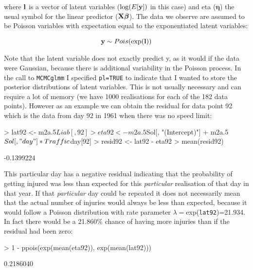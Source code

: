 \documentclass{article}
\begin{document}
where ${\bf l}$ is a vector of latent variables ($\textrm{log}(E[{\bf y}])$ in this case) and eta (${\bm \eta}$) the usual symbol for the linear predictor (${\bf X}{\bm \beta}$). The data we observe are assumed to be Poisson variables with expectation equal to the exponentiated latent variables: 

\begin{equation}
{\bf y} \sim Pois(\textrm{exp}({\bf l}))
\end{equation}


Note that the latent variable does not exactly predict y, as it would if the data were Gaussian, because there is additional variability in the Poisson process. In the call to \texttt{MCMCglmm} I specified \texttt{pl=TRUE} to indicate that I wanted to store the posterior distributions of latent variables. This is not usually necessary and can require a lot of memory (we have 1000 realisations for each of the 182 data points). However as an example we can obtain the residual for data point 92 which is the data from day 92 in 1961 when there was no speed limit:

\begin{Schunk}
\begin{Sinput}
> lat92 <- m2a.5$Liab[, 92]
> eta92 <- m2a.5$Sol[, "(Intercept)"] + m2a.5$Sol[, "day"] * Traffic$day[92]
> resid92 <- lat92 - eta92
> mean(resid92)
\end{Sinput}
\begin{Soutput}
[1] -0.1399224
\end{Soutput}
\end{Schunk}

This particular day has a negative residual indicating that the probability of getting injured was less than expected for this \emph{particular} realisation of that day in that year. If that \emph{particular} day could be repeated it does not necessarily mean that the actual number of injuries would always be less than expected, because it would follow a Poisson distribution with rate parameter $\lambda=$exp(\texttt{lat92})=21.934. In fact there would be a 21.860\% chance of having more injuries than if the residual had been zero:

\begin{Schunk}
\begin{Sinput}
> 1 - ppois(exp(mean(eta92)), exp(mean(lat92)))
\end{Sinput}
\begin{Soutput}
[1] 0.2186040
\end{Soutput}
\end{Schunk}
\end{document}
